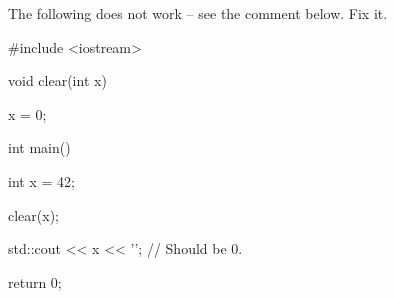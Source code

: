The following does not work -- see the comment below. Fix it.



\begin{consolethree}[escapeinside=||]

#include <iostream>



void clear(int x)

{

    x = 0;

}



int main()

{

    int x = 42;

    clear(x);

    std::cout << x << '\n'; // Should be 0.

    return 0;

}

\end{consolethree}

